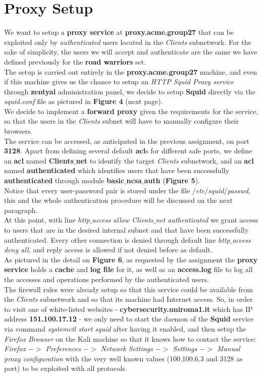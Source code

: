 \section{Proxy Setup}
We want to setup a \textbf{proxy service} at \textbf{proxy.acme.group27} that can be exploited only by \textit{authenticated} users located in the \textit{Clients} subnetwork. For the sake of simplicity, the users we will accept and authenticate are the same we have defined previously for the \textbf{road warriors} set.\\
The setup is carried out entirely in the \textbf{proxy.acme.group27} machine, and even if this machine gives us the chance to setup an \textit{HTTP Squid Proxy service} through \textbf{zentyal} administration panel, we decide to setup \textbf{Squid} directly via the \textit{squid.conf} file as pictured in \textbf{Figure 4} (next page).\\
We decide to implement a \textbf{forward proxy} given the requirements for the service, so that the users in the \textit{Clients} subnet will have to manually configure their browsers.\\
The service can be accessed, as anticipated in the previous assignment, on port \textbf{3128}. Apart from defining several default \textbf{acl}s for different safe ports, we define an \textbf{acl} named \textbf{Clients$\_$net} to identify the target \textit{Clients} subnetwork, and an \textbf{acl} named \textbf{authenticated} which identifies users that have been successfully \textbf{authenticated} through module \textbf{basic$\_$ncsa$\_$auth} (\textbf{Figure 5}).\\
Notice that every user-password pair is stored under the file \textit{$/$etc$/$squid$/$passwd}, this and the whole authentication procedure will be discussed on the next paragraph.\\
At this point, with line \textit{http$\_$access allow Clients$\_$net authenticated} we grant access to users that are in the desired internal subnet and that have been successfully authenticated. Every other connection is denied through default line \textit{http$\_$access deny all}, and reply access is allowed if not denied before as default.\\
As pictured in the detail on \textbf{Figure 6}, as requested by the assignment the \textbf{proxy service} holds a \textbf{cache} and \textbf{log file} for it, as well as an \textbf{access.log} file to log all the accesses and operations performed by the authenticated users.\\
The firewall rules were already setup so that this service could be available from the \textit{Clients} subnetwork and so that its machine had Internet access. So, in order to visit one of white-listed websites - \textbf{cybersecurity.uniroma1.it} which has IP address \textbf{151.100.17.12} - we only need to start the daemon of the \textbf{Squid} service via command \textit{systemctl start squid} after having it enabled, and then setup the \textit{Firefox Browser} on the Kali machine so that it knows how to contact the service: \textit{Firefox $->$ Preferences $->$ Network Settings $->$ Settings $->$ Manual proxy configuration} with the very well known values (100.100.6.3 and 3128 as port) to be exploited with all protocols.\\
